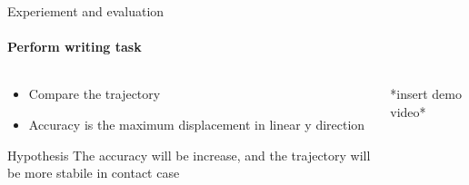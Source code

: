 \documentclass[aspectratio=169]{beamer}
\begin{document}
  \begin{frame}{Experiement and evaluation}
    \framesubtitle{Perform writing task}
    \begin{columns}[c]
      \begin{column}{.5\textwidth}
        \begin{itemize}
          \item Compare the trajectory
          \item Accuracy is the maximum displacement
          in linear y direction
        \end{itemize}     
        \centering
        \begin{block}{Hypothesis}
          The accuracy will be increase, and the trajectory will be more stabile in contact case
        \end{block}

      \end{column}
      \begin{column}{.5\textwidth}
        \centering
        *insert demo video*
      \end{column}
      \end{columns}
  \end{frame}
\end{document}
